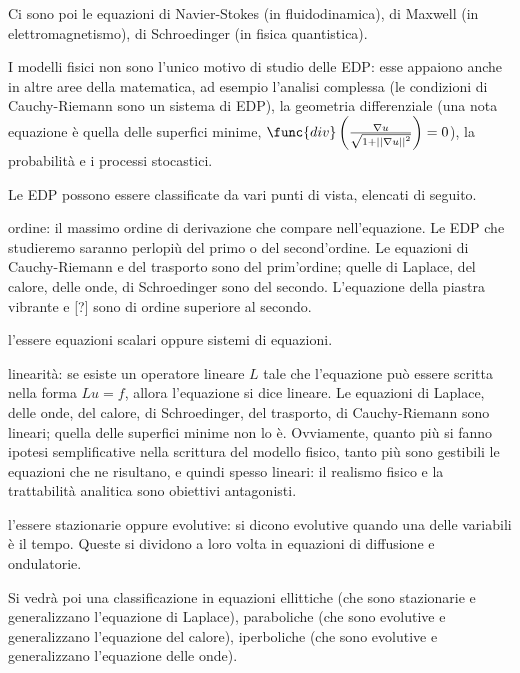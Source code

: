 \documentclass{article}
\begin{document}
Ci sono poi le equazioni di Navier-Stokes (in fluidodinamica), di Maxwell
(in elettromagnetismo), di Schroedinger (in fisica quantistica).

I modelli fisici non sono l'unico motivo di studio delle EDP: esse appaiono
anche in altre aree della matematica, ad esempio l'analisi complessa (le
condizioni di Cauchy-Riemann sono un sistema di EDP), la geometria
differenziale (una nota equazione \`{e} quella delle superfici minime, $%
\func{div}\left( \frac{\nabla u}{\sqrt{1+\left\vert \left\vert \nabla
u\right\vert \right\vert ^{2}}}\right) =0$), la probabilit\`{a} e i processi
stocastici.

Le EDP possono essere classificate da vari punti di vista, elencati di
seguito.

\begin{description}
\item[i] ordine: il massimo ordine di derivazione che compare
nell'equazione. Le EDP che studieremo saranno perlopi\`{u} del primo o del
second'ordine. Le equazioni di Cauchy-Riemann e del trasporto sono del
prim'ordine; quelle di Laplace, del calore, delle onde, di Schroedinger sono
del secondo. L'equazione della piastra vibrante e [?] sono di ordine
superiore al secondo.

\item[ii] l'essere equazioni scalari oppure sistemi di equazioni.

\item[iii] linearit\`{a}: se esiste un operatore lineare $L$ tale che
l'equazione pu\`{o} essere scritta nella forma $Lu=f$, allora l'equazione si
dice lineare. Le equazioni di Laplace, delle onde, del calore, di
Schroedinger, del trasporto, di Cauchy-Riemann sono lineari; quella delle
superfici minime non lo \`{e}. Ovviamente, quanto pi\`{u} si fanno ipotesi
semplificative nella scrittura del modello fisico, tanto pi\`{u} sono
gestibili le equazioni che ne risultano, e quindi spesso lineari: il
realismo fisico e la trattabilit\`{a} analitica sono obiettivi antagonisti.

\item[iv] l'essere stazionarie oppure evolutive: si dicono evolutive quando
una delle variabili \`{e} il tempo. Queste si dividono a loro volta in
equazioni di diffusione e ondulatorie.

\item Si vedr\`{a} poi una classificazione in equazioni ellittiche (che sono
stazionarie e generalizzano l'equazione di Laplace), paraboliche (che sono
evolutive e generalizzano l'equazione del calore), iperboliche (che sono
evolutive e generalizzano l'equazione delle onde).
\end{description}
\end{document}
